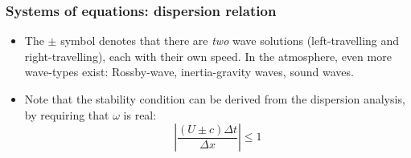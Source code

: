 \documentclass[aspectratio=43,9pt]{beamer}
\begin{document}
%
%
\begin{frame}
	\frametitle{Systems of equations: dispersion relation}
	\begin{itemize}
		\item The $\pm$ symbol denotes that there are \emph{two} wave solutions (left-travelling and right-travelling), each with their own speed. In the atmosphere, even more wave-types exist: Rossby-wave, inertia-gravity waves, sound waves.\vspace*{2ex}
		\item Note that the stability condition can be derived from the dispersion analysis, by requiring that $\omega$ is real:
			\begin{equation*}
				\left |\frac{(U\pm c)\Delta t}{\Delta x} \right| \leq 1
			\end{equation*}
	\end{itemize}
\end{frame}
%
%
\end{document}
